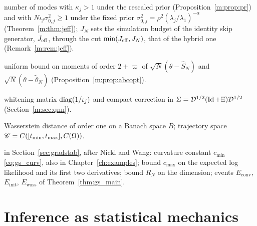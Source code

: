 \begin{description}[leftmargin=2.2em,labelwidth=1.8em,labelsep=0.4em,itemsep=0pt,parsep=0pt]
\item[$J^{\rm eff}_N,\ J_{\rm eff}$] number of modes with $\kappa_j>1$ under the rescaled prior (Proposition~\ref{m:prop:pr}) and with $N\iota_j\sigma^2_{0,j}\ge1$ under the fixed prior $\sigma^2_{0,j}=\rho^2(\lambda_j/\lambda_1)^{-\alpha}$ (Theorem~\ref{m:thm:jeff}); $J_N$ sets the simulation budget of the identity skip generator, $J_{\rm eff}$, through the cut $\min(J_{\rm eff},J_N)$, that of the hybrid one (Remark~\ref{m:rem:jeff}).
\item[\eqref{m:eq:momentbound}] uniform bound on moments of order $2+\varpi$ of $\sqrt N(\theta-\hat S_N)$ and $\sqrt N(\theta-\tilde\theta_N)$ (Proposition~\ref{m:prop:abcopt}).
\item[$\mathcal D,\ \Xi$] whitening matrix $\operatorname{diag}(1/\iota_j)$ and compact correction in $\Sigma=\mathcal D^{1/2}(\operatorname{Id}+\Xi)\mathcal D^{1/2}$ (Section~\ref{m:sec:qnn}).
\item[$\Wone_{1,B},\ \Ccal$] Wasserstein distance of order one on a Banach space $B$; trajectory space $\mathscr{C}=C([t_{\min},t_{\max}],C(\Omega))$.
\item[$c_{\min},\ R_N$] in Section~\ref{sec:gradstab}, after Nickl and Wang: curvature constant $c_{\min}$ \eqref{eq:gs_curv}, also in Chapter~\ref{ch:examples}; bound $c_{\max}$ on the expected log likelihood and its first two derivatives; bound $R_N$ on the dimension; events $E_{\mathrm{conv}}$, $E_{\mathrm{init}}$, $E_{\mathrm{wass}}$ of Theorem~\ref{thm:gs_main}.
\end{description}

\section*{Inference as statistical mechanics}

